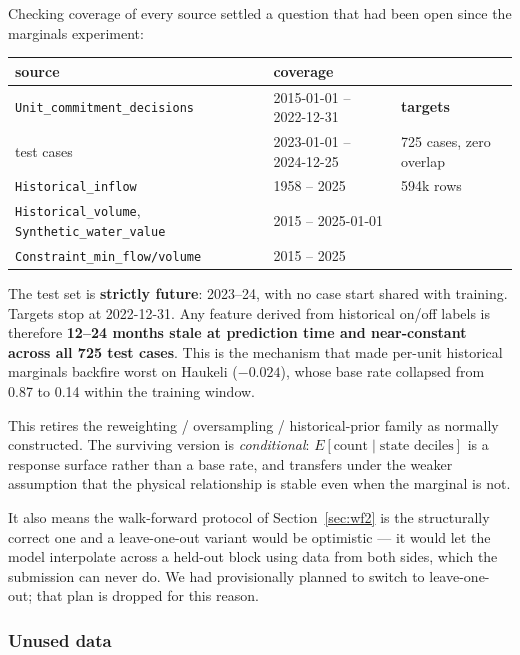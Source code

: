 Checking coverage of every source settled a question that had been open since the marginals
experiment:

\begin{center}\small
\begin{tabular}{lll}
\toprule
source & coverage & \\
\midrule
\texttt{Unit\_commitment\_decisions} & 2015-01-01 -- 2022-12-31 & \textbf{targets} \\
test cases                            & 2023-01-01 -- 2024-12-25 & 725 cases, zero overlap \\
\texttt{Historical\_inflow}           & 1958 -- 2025 & 594k rows \\
\texttt{Historical\_volume}, \texttt{Synthetic\_water\_value} & 2015 -- 2025-01-01 & \\
\texttt{Constraint\_min\_flow/volume} & 2015 -- 2025 & \\
\bottomrule
\end{tabular}
\end{center}

\begin{finding}
The test set is \textbf{strictly future}: 2023--24, with no case start shared with training.
Targets stop at 2022-12-31. Any feature derived from historical on/off labels is therefore
\textbf{12--24 months stale at prediction time and near-constant across all 725 test cases}.
This is the mechanism that made per-unit historical marginals backfire worst on Haukeli
($-0.024$), whose base rate collapsed from 0.87 to 0.14 within the training window.
\end{finding}

This retires the reweighting / oversampling / historical-prior family as normally constructed.
The surviving version is \emph{conditional}: $E[\text{count} \mid \text{state deciles}]$ is a
response surface rather than a base rate, and transfers under the weaker assumption that the
physical relationship is stable even when the marginal is not.

It also means the walk-forward protocol of Section~\ref{sec:wf2} is the structurally correct
one and a leave-one-out variant would be optimistic --- it would let the model interpolate
across a held-out block using data from both sides, which the submission can never do. We had
provisionally planned to switch to leave-one-out; that plan is dropped for this reason.

\subsubsection*{Unused data}

